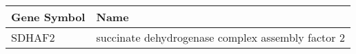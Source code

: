 \begin{tabular}{ll}
\toprule
Gene Symbol &                                              Name \\
\midrule
     SDHAF2 & succinate dehydrogenase complex assembly factor 2 \\
\bottomrule
\end{tabular}
